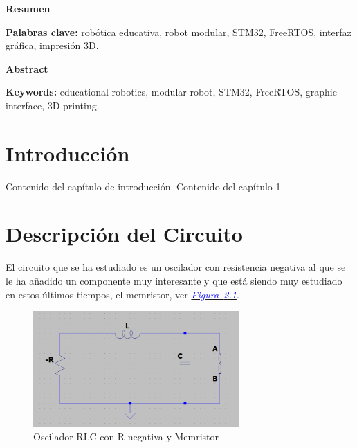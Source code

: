 \documentclass[12pt,a4paper]{report} %
\newcommand{\figureref}[1]{\hyperref[#1]{\textcolor{blue}{\textit{Figura~\ref*{#1}}}}}
\begin{document}
	\clearpage
	\null
	\thispagestyle{empty}
	\newpage

\begin{center}
	\LARGE\textbf{Resumen}
\end{center}
\begin{minipage}{\textwidth}
	\lipsum[1]
	
	\vspace{0.5cm}
	\noindent \textbf{Palabras clave:} robótica educativa, robot modular, STM32, FreeRTOS, interfaz gráfica, impresión 3D.
\end{minipage}

\vspace{1cm}

\begin{center}
	\LARGE\textbf{Abstract}
\end{center}
\begin{minipage}{\textwidth}
	\lipsum[2]
	
	\vspace{0.5cm}
	\noindent \textbf{Keywords:} educational robotics, modular robot, STM32, FreeRTOS, graphic interface, 3D printing.
\end{minipage}
\newpage
	
\tableofcontents
	\chapter{Introducción}
	Contenido del capítulo de introducción. Contenido del capítulo 1.
	
	\chapter{Descripción del Circuito}
	El circuito que se ha estudiado es un oscilador con resistencia negativa al que se le ha añadido un componente muy interesante y que está siendo muy estudiado en estos últimos tiempos, el memristor, ver \figureref{fig:-RLCM}.
	
	\begin{figure}[h]
		\centering
		\includegraphics[width=0.7\textwidth]{-RLCM.png}
		\caption{Oscilador RLC con R negativa y Memristor}
		\label{fig:-RLCM}
	\end{figure}
	
\end{document}

